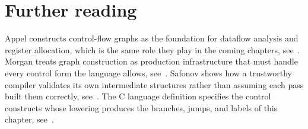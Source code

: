 \section{Further reading}
\label{sec:ch07-further-reading}

Appel constructs control-flow graphs as the foundation for dataflow analysis and register allocation, which is the same role they play in the coming chapters, see~\cite{appel-1998-modern}.
Morgan treats graph construction as production infrastructure that must handle every control form the language allows, see~\cite{morgan-1998-optimizing}.
Safonov shows how a trustworthy compiler validates its own intermediate structures rather than assuming each pass built them correctly, see~\cite{safonov-2010-trustworthy}.
The C language definition specifies the control constructs whose lowering produces the branches, jumps, and labels of this chapter, see~\cite{wg14-2011-c11}.
